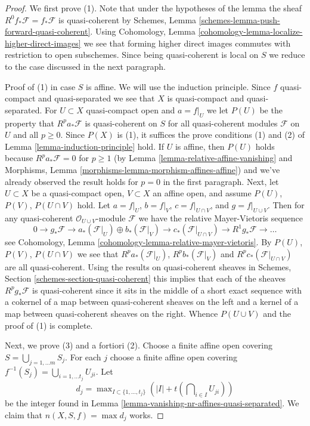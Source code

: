 \begin{proof}
We first prove (1). Note that under the hypotheses of the lemma the sheaf
$R^0f_*\mathcal{F} = f_*\mathcal{F}$ is quasi-coherent by
Schemes, Lemma \ref{schemes-lemma-push-forward-quasi-coherent}.
Using
Cohomology, Lemma \ref{cohomology-lemma-localize-higher-direct-images}
we see that forming higher direct images commutes with restriction
to open subschemes. Since being quasi-coherent is local on $S$ we
reduce to the case discussed in the next paragraph.

\medskip\noindent
Proof of (1) in case $S$ is affine. We will use the induction principle.
Since $f$ quasi-compact and quasi-separated we see that $X$
is quasi-compact and quasi-separated. For $U \subset X$
quasi-compact open and $a = f|_U$ we let $P(U)$ be the property that
$R^pa_*\mathcal{F}$ is quasi-coherent on $S$ for all quasi-coherent modules
$\mathcal{F}$ on $U$ and all $p \geq 0$. Since $P(X)$ is (1), it suffices
the prove conditions (1) and (2) of Lemma \ref{lemma-induction-principle} hold.
If $U$ is affine, then $P(U)$ holds because $R^pa_*\mathcal{F} = 0$ for
$p \geq 1$ (by  Lemma \ref{lemma-relative-affine-vanishing} and
Morphisms, Lemma \ref{morphisms-lemma-morphism-affines-affine})
and we've already observed the result holds for $p = 0$ in the first
paragraph. Next, let $U \subset X$ be a quasi-compact open, $V \subset X$
an affine open, and assume $P(U)$, $P(V)$, $P(U \cap V)$ hold.
Let $a = f|_U$, $b = f|_V$, $c = f|_{U \cap V}$, and $g = f|_{U \cup V}$.
Then for any quasi-coherent $\mathcal{O}_{U \cup V}$-module $\mathcal{F}$
we have the relative Mayer-Vietoris sequence
$$
0 \to
g_*\mathcal{F} \to
a_*(\mathcal{F}|_U) \oplus b_*(\mathcal{F}|_V) \to
c_*(\mathcal{F}|_{U \cap V}) \to
R^1g_*\mathcal{F} \to \ldots
$$
see Cohomology, Lemma \ref{cohomology-lemma-relative-mayer-vietoris}.
By $P(U)$, $P(V)$, $P(U \cap V)$ we see that
$R^pa_*(\mathcal{F}|_U)$, $R^pb_*(\mathcal{F}|_V)$ and
$R^pc_*(\mathcal{F}|_{U \cap V})$ are all quasi-coherent.
Using the results on quasi-coherent sheaves in
Schemes, Section \ref{schemes-section-quasi-coherent}
this implies that each of the sheaves
$R^pg_*\mathcal{F}$ is quasi-coherent since it sits in the middle of a short
exact sequence with a cokernel of a map between quasi-coherent sheaves
on the left and a kernel of a map between quasi-coherent sheaves on the right.
Whence $P(U \cup V)$ and the proof of (1) is complete.

\medskip\noindent
Next, we prove (3) and a fortiori (2). Choose a finite affine open
covering $S = \bigcup_{j = 1, \ldots m} S_j$. For each $j$ choose
a finite affine open covering
$f^{-1}(S_j) = \bigcup_{i = 1, \ldots t_j} U_{ji} $.
Let
$$
d_j = \max\nolimits_{I \subset \{1, \ldots, t_j\}}
\left(|I| + t(\bigcap\nolimits_{i \in I} U_{ji})\right)
$$
be the integer found in
Lemma \ref{lemma-vanishing-nr-affines-quasi-separated}.
We claim that $n(X, S, f) = \max d_j$ works.


\end{proof}
